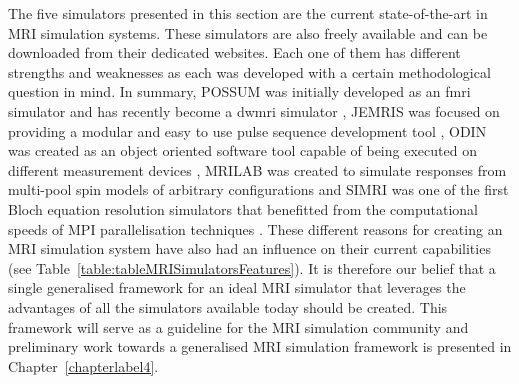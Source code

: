 

    
    
    



\hfill

The five simulators presented in this section are the current state-of-the-art in MRI simulation systems.
These simulators are also freely available and can be downloaded from their dedicated websites.
Each one of them has different strengths and weaknesses as each was developed with a certain methodological question in mind.
In summary, 
POSSUM was initially developed as an \ac{fmri} simulator \cite{Drobnjak2006} and has recently become a \ac{dwmri} simulator \cite{Graham2016}, 
JEMRIS was focused on providing a modular and easy to use pulse sequence development tool \cite{Stocker2010}, 
ODIN was created as an object oriented software tool capable of being executed on different measurement devices \cite{Jochimsen2004},
MRILAB was created to simulate responses from multi-pool spin models of arbitrary configurations \cite{Liu2017}
and
SIMRI was one of the first Bloch equation resolution simulators that benefitted from the computational speeds of MPI parallelisation techniques \cite{Benoit-Cattin2005}.
These different reasons for creating an MRI simulation system have also had an influence on their current capabilities (see Table~\ref{table:tableMRISimulatorsFeatures}).
It is therefore our belief that a single generalised framework for an ideal MRI simulator that leverages the advantages of all the simulators available today should be created.
This framework will serve as a guideline for the MRI simulation community and preliminary work towards a generalised MRI simulation framework is presented in Chapter~\ref{chapterlabel4}.


